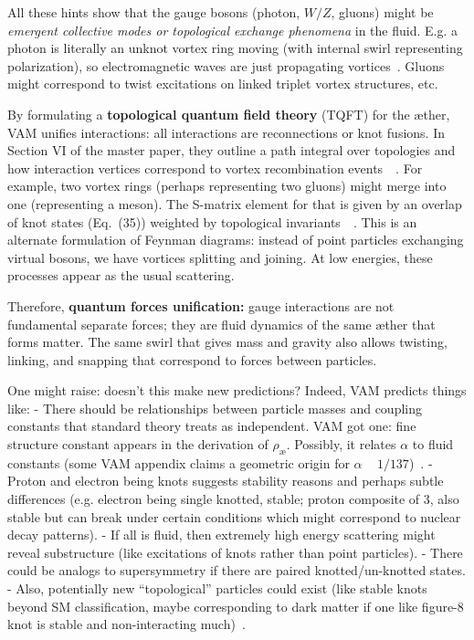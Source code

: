 \documentclass[a4paper,12pt]{article}
\begin{document}
    All these hints show that the gauge bosons (photon, $W/Z$, gluons) might be \emph{emergent collective modes or topological exchange phenomena} in the fluid. E.g. a photon is literally an unknot vortex ring moving (with internal swirl representing polarization), so electromagnetic waves are just propagating vortices~\cite{reference_159}. Gluons might correspond to twist excitations on linked triplet vortex structures, etc.

    By formulating a \textbf{topological quantum field theory} (TQFT) for the æther, VAM unifies interactions: all interactions are reconnections or knot fusions. In Section VI of the master paper, they outline a path integral over topologies and how interaction vertices correspond to vortex recombination events~\cite{reference_160}~\cite{reference_161}. For example, two vortex rings (perhaps representing two gluons) might merge into one (representing a meson). The S-matrix element for that is given by an overlap of knot states (Eq.~(35)) weighted by topological invariants~\cite{reference_162}~\cite{reference_163}. This is an alternate formulation of Feynman diagrams: instead of point particles exchanging virtual bosons, we have vortices splitting and joining. At low energies, these processes appear as the usual scattering.

    Therefore, \textbf{quantum forces unification:} gauge interactions are not fundamental separate forces; they are fluid dynamics of the same æther that forms matter. The same swirl that gives mass and gravity also allows twisting, linking, and snapping that correspond to forces between particles.

    One might raise: doesn’t this make new predictions? Indeed, VAM predicts things like:
    - There should be relationships between particle masses and coupling constants that standard theory treats as independent. VAM got one: fine structure constant appears in the derivation of $\rho_{\text{\ae}}$. Possibly, it relates $\alpha$ to fluid constants (some VAM appendix claims a geometric origin for $\alpha$ ~ $1/137$)~\cite{reference_164}.
    - Proton and electron being knots suggests stability reasons and perhaps subtle differences (e.g. electron being single knotted, stable; proton composite of 3, also stable but can break under certain conditions which might correspond to nuclear decay patterns).
    - If all is fluid, then extremely high energy scattering might reveal substructure (like excitations of knots rather than point particles).
    - There could be analogs to supersymmetry if there are paired knotted/un-knotted states.
    - Also, potentially new “topological” particles could exist (like stable knots beyond SM classification, maybe corresponding to dark matter if one like figure-8 knot is stable and non-interacting much)~\cite{reference_165}.
\end{document}

